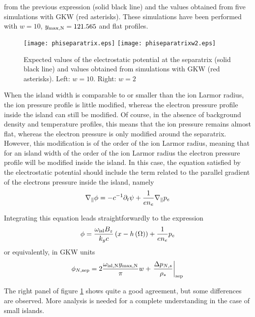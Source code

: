  from the previous expression (solid black line) and the values obtained from five simulations with GKW (red asterisks). These simulations have been performed with $w=10$, $y_{\rm max,N}=121.565$ and flat profiles.
\begin{figure}
\begin{center}
\texttt{[image: phiseparatrix.eps]}
\texttt{[image: phiseparatrixw2.eps]}
\label{fig:phiseparatrix}
\caption{Expected values of the electrostatic potential at the separatrix (solid black line) and values obtained from simulations with GKW (red asterisks). Left: $w=10$. Right: $w=2$}
\end{center}
\end{figure}

When the island width is comparable to or smaller than the ion Larmor radius, the ion pressure profile is little modified, whereas the electron pressure profile inside the island can still be modified.
 Of course, in the absence of background density and temperature profiles, this means that the ion pressure remains almost flat, whereas the electron pressure is only modified around the separatrix. However, this
  modification is of the order of the ion Larmor radius, meaning that for an island width of the order of the ion Larmor radius the electron pressure profile will be modified inside the island.
   In this case, the equation satisfied by the electrostatic potential should include the term related to the parallel gradient of the electrons pressure inside the island, namely
\begin{equation}
\nabla_\parallel\phi=-c^{-1}\partial_t \psi + {1\over en_e}\nabla_\parallel p_e
\end{equation}

Integrating this equation leads straightforwardly to the expression
\begin{equation}
\phi = {\omega_{\rm isl}B_z\over k_y c}\left(x-h\left(\Omega\right)\right) + {1\over en_e}p_e
\end{equation}
or equivalently, in GKW units
\begin{equation}
\phi_{N,\rm sep} = 2{\omega_{\rm isl,N}y_{\rm max,N}\over \pi}w + \left.{\Delta p_{N,s} \over \rho_*}\right\vert_{\rm sep}
\end{equation}

The right panel of figure \ref{fig:phiseparatrix} shows quite a good agreement, but some differences are observed. More analysis is needed for a complete understanding in the case of small islands.


